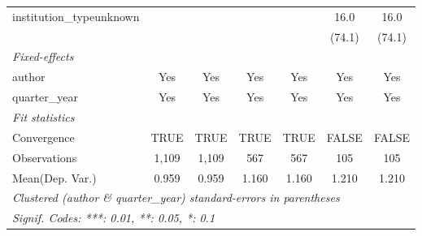 \begin{tabular}{lcccccc}
   institution\_typeunknown              &               &               &              &              & 16.0          & 16.0\\   
                                         &               &               &              &              & (74.1)        & (74.1)\\   
   \midrule
   \emph{Fixed-effects}\\
   author                                & Yes           & Yes           & Yes          & Yes          & Yes           & Yes\\  
   quarter\_year                         & Yes           & Yes           & Yes          & Yes          & Yes           & Yes\\  
   \midrule
   \emph{Fit statistics}\\
   Convergence                           &TRUE           & TRUE          & TRUE         & TRUE         & FALSE         & FALSE\\  
   Observations                          & 1,109         & 1,109         & 567          & 567          & 105           & 105\\  
Mean(Dep. Var.) & 0.959 & 0.959 & 1.160 & 1.160 & 1.210 & 1.210 \\
   \midrule \midrule
   \multicolumn{7}{l}{\emph{Clustered (author \& quarter\_year) standard-errors in parentheses}}\\
   \multicolumn{7}{l}{\emph{Signif. Codes: ***: 0.01, **: 0.05, *: 0.1}}\\
\end{tabular}
\par\endgroup
